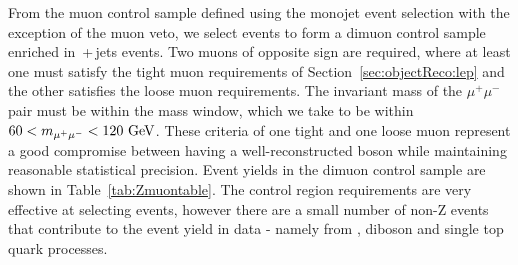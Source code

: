 From the muon control sample defined using the monojet event selection with the exception of the muon veto, we select events to form a dimuon control sample enriched in \zmumubr{}\,+\,jets events.
Two muons of opposite sign are required, where at least one must satisfy the tight muon requirements of Section~\ref{sec:objectReco:lep} and the other satisfies the loose muon requirements.
The invariant mass of the $\mu^{+}\mu^{-}$ pair must be within the \Z{} mass window, which we take to be within $60<m_{\mu^{+}\mu^{-}}<120~\mathrm{GeV}$. 
These criteria of one tight and one loose muon represent a good compromise between having a well-reconstructed \Z{} boson while maintaining reasonable statistical precision.
Event yields in the dimuon control sample are shown in Table~\ref{tab:Zmuontable}.
The control region requirements are very effective at selecting \zellell events, however there are a small number of non-Z events that contribute to the event yield in data - namely from \ttbar, diboson and single top quark processes.


